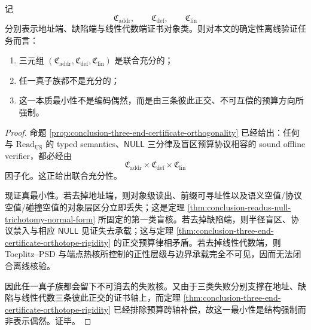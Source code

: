 \begin{theorem}[三端证书的联合充分性与真最小性]\label{thm:conclusion-three-end-certificate-joint-sufficiency-minimality}
记
\[
\mathfrak C_{\mathrm{addr}},
\qquad
\mathfrak C_{\mathrm{def}},
\qquad
\mathfrak C_{\mathrm{lin}}
\]
分别表示地址端、缺陷端与线性代数端证书对象类。则对本文的确定性离线验证任务而言：
\begin{enumerate}
  \item 三元组 \((\mathfrak C_{\mathrm{addr}},\mathfrak C_{\mathrm{def}},\mathfrak C_{\mathrm{lin}})\) 是联合充分的；
  \item 任一真子族都不是充分的；
  \item 这一本质最小性不是编码偶然，而是由三条彼此正交、不可互偿的预算方向所强制。
\end{enumerate}
\end{theorem}
\begin{proof}
命题 \ref{prop:conclusion-three-end-certificate-orthogonality} 已经给出：任何与 \(\mathrm{Read}_{\mathrm{US}}\) 的 typed semantics、\(\mathsf{NULL}\) 三分律及盲区预算协议相容的 sound offline verifier，都必经由
\[
\mathfrak C_{\mathrm{addr}}\times\mathfrak C_{\mathrm{def}}\times\mathfrak C_{\mathrm{lin}}
\]
因子化。这正给出联合充分性。

现证真最小性。若去掉地址端，则对象级读出、前缀可寻址性以及语义空值/协议空值/碰撞空值的对象层区分立即丢失；这是定理 \ref{thm:conclusion-readus-null-trichotomy-normal-form} 所固定的第一类盲核。若去掉缺陷端，则半径盲区、协议禁入与相应 \(\mathsf{NULL}\) 见证失去承载；这与定理 \ref{thm:conclusion-three-end-certificate-orthotope-rigidity} 的正交预算律相矛盾。若去掉线性代数端，则 Toeplitz--PSD 与端点热核所控制的正性层级与边界承载完全不可见，因而无法闭合离线核验。

因此任一真子族都会留下不可消去的失败核。又由于三类失败分别支撑在地址、缺陷与线性代数三条彼此正交的证书轴上，而定理 \ref{thm:conclusion-three-end-certificate-orthotope-rigidity} 已经排除预算跨轴补偿，故这一最小性是结构强制而非表示偶然。证毕。
\end{proof}

